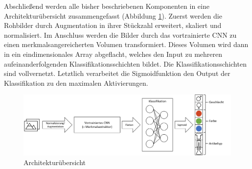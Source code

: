 Abschließend werden alle bisher beschriebenen Komponenten in eine Architekturübersicht zusammengefasst (Abbildung \ref{fig:generalArch}). Zuerst werden die Rohbilder durch Augmentation in ihrer Stückzahl erweitert, skaliert und normalisiert. Im Anschluss werden die Bilder durch das vortrainierte CNN zu einen merkmalsangereicherten Volumen transformiert. Dieses Volumen wird dann in ein eindimensionales Array abgeflacht, welches den Input zu mehreren aufeinanderfolgenden Klassifikationsschichten bildet. Die Klassifikationsschichten sind vollvernetzt. Letztlich verarbeitet die Sigmoidfunktion den Output der Klassifikation zu den maximalen Aktivierungen.
\begin{figure}[H]
	\centering
	\includegraphics[width=0.9\linewidth]{images/general_architecture.png}
	\caption{Architekturübersicht}
	\label{fig:generalArch}
\end{figure}

